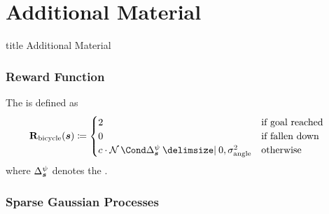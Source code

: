 \appendix
\section{Additional Material}
\begin{frame}
    \vfill
    \centering
    \begin{beamercolorbox}[sep=8pt,center]{title}
        Additional Material\par%
    \end{beamercolorbox}
    \vfill
\end{frame}


\begin{frame}[label=solution_reward]
    \frametitle{Reward Function}

    \begin{definition}
        The  is defined as
        \begin{align}
            \RwdBicycle(\mat{s}) &\coloneqq \begin{cases}
                    2 & \text{if goal reached} \\
                    0 & \text{if fallen down} \\
                    c\cdot\Gaussian{\Delta^\psi_{\mat{s}} \given 0, \sigma_{\text{angle}}^2} & \text{otherwise}
                \end{cases}
        \end{align}
    where $\Delta^\psi_{\bm{s}}$ denotes the .
    \end{definition}
    \vspace{2ex}
    \centering
    
\end{frame}

\begin{frame}[label=gp_sparse]
    \frametitle{Sparse Gaussian Processes}

    \centering
\end{frame}


